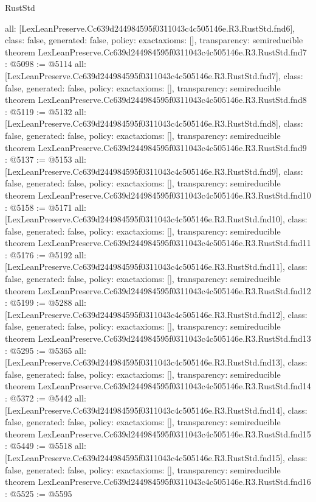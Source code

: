 \begin{lexlean}{RustStd}
\begin{coremodule}
{  all: [LexLeanPreserve.Cc639d244984595f0311043c4c505146e.R3.RustStd.fnd6],
  class: false,
  generated: false,
  policy: exact{axioms: []},
  transparency: semireducible
}
theorem LexLeanPreserve.Cc639d244984595f0311043c4c505146e.R3.RustStd.fnd7 : @5098 := @5114 {
  all: [LexLeanPreserve.Cc639d244984595f0311043c4c505146e.R3.RustStd.fnd7],
  class: false,
  generated: false,
  policy: exact{axioms: []},
  transparency: semireducible
}
theorem LexLeanPreserve.Cc639d244984595f0311043c4c505146e.R3.RustStd.fnd8 : @5119 := @5132 {
  all: [LexLeanPreserve.Cc639d244984595f0311043c4c505146e.R3.RustStd.fnd8],
  class: false,
  generated: false,
  policy: exact{axioms: []},
  transparency: semireducible
}
theorem LexLeanPreserve.Cc639d244984595f0311043c4c505146e.R3.RustStd.fnd9 : @5137 := @5153 {
  all: [LexLeanPreserve.Cc639d244984595f0311043c4c505146e.R3.RustStd.fnd9],
  class: false,
  generated: false,
  policy: exact{axioms: []},
  transparency: semireducible
}
theorem LexLeanPreserve.Cc639d244984595f0311043c4c505146e.R3.RustStd.fnd10 : @5158 := @5171 {
  all: [LexLeanPreserve.Cc639d244984595f0311043c4c505146e.R3.RustStd.fnd10],
  class: false,
  generated: false,
  policy: exact{axioms: []},
  transparency: semireducible
}
theorem LexLeanPreserve.Cc639d244984595f0311043c4c505146e.R3.RustStd.fnd11 : @5176 := @5192 {
  all: [LexLeanPreserve.Cc639d244984595f0311043c4c505146e.R3.RustStd.fnd11],
  class: false,
  generated: false,
  policy: exact{axioms: []},
  transparency: semireducible
}
theorem LexLeanPreserve.Cc639d244984595f0311043c4c505146e.R3.RustStd.fnd12 : @5199 := @5288 {
  all: [LexLeanPreserve.Cc639d244984595f0311043c4c505146e.R3.RustStd.fnd12],
  class: false,
  generated: false,
  policy: exact{axioms: []},
  transparency: semireducible
}
theorem LexLeanPreserve.Cc639d244984595f0311043c4c505146e.R3.RustStd.fnd13 : @5295 := @5365 {
  all: [LexLeanPreserve.Cc639d244984595f0311043c4c505146e.R3.RustStd.fnd13],
  class: false,
  generated: false,
  policy: exact{axioms: []},
  transparency: semireducible
}
theorem LexLeanPreserve.Cc639d244984595f0311043c4c505146e.R3.RustStd.fnd14 : @5372 := @5442 {
  all: [LexLeanPreserve.Cc639d244984595f0311043c4c505146e.R3.RustStd.fnd14],
  class: false,
  generated: false,
  policy: exact{axioms: []},
  transparency: semireducible
}
theorem LexLeanPreserve.Cc639d244984595f0311043c4c505146e.R3.RustStd.fnd15 : @5449 := @5518 {
  all: [LexLeanPreserve.Cc639d244984595f0311043c4c505146e.R3.RustStd.fnd15],
  class: false,
  generated: false,
  policy: exact{axioms: []},
  transparency: semireducible
}
theorem LexLeanPreserve.Cc639d244984595f0311043c4c505146e.R3.RustStd.fnd16 : @5525 := @5595 {
}
\end{coremodule}
\end{lexlean}
